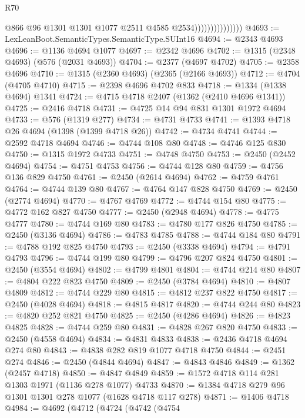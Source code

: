 \begin{lexlean}{R70}
\begin{coremodule}
                                  @866
                                  @96
                                  @1301
                                  @1301
                                  @1077
                                  @2511
                                  @4585
                                  @2534)))))))))))))))
@4693 := LexLeanBoot.SemanticTypes.SemanticType.SUInt16
@4694 := @2343 @4693
@4696 := @1136 @4694 @1077
@4697 := @2342 @4696
@4702 := @1315 (@2348 @4693) (@576 (@2031 @4693))
@4704 := @2377 (@4697 @4702)
@4705 := @2358 @4696
@4710 := @1315 (@2360 @4693) (@2365 (@2166 @4693))
@4712 := @4704 (@4705 @4710)
@4715 := @2398 @4696 @4702 @833
@4718 := @1334 (@1338 @4694) @1341
@4724 := @4715 @4718 @2407 (@1362 (@2410 @4696 @1341))
@4725 := @2416 @4718
@4731 := @4725 @14 @94 @831 @1301 @1972 @4694
@4733 := @576 (@1319 @277)
@4734 := @4731 @4733
@4741 := @1393 @4718 @26 @4694 (@1398 (@1399 @4718 @26))
@4742 := @4734 @4741
@4744 := @2592 @4718 @4694
@4746 := @4744 @108 @80
@4748 := @4746 @125 @830
@4750 := @1315 @1972 @4733
@4751 := @4748 @4750
@4753 := @2450 (@2452 @4694)
@4754 := @4751 @4753
@4756 := @4744 @128 @80
@4759 := @4756 @136 @829 @4750
@4761 := @2450 (@2614 @4694)
@4762 := @4759 @4761
@4764 := @4744 @139 @80
@4767 := @4764 @147 @828 @4750
@4769 := @2450 (@2774 @4694)
@4770 := @4767 @4769
@4772 := @4744 @154 @80
@4775 := @4772 @162 @827 @4750
@4777 := @2450 (@2948 @4694)
@4778 := @4775 @4777
@4780 := @4744 @169 @80
@4783 := @4780 @177 @826 @4750
@4785 := @2450 (@3136 @4694)
@4786 := @4783 @4785
@4788 := @4744 @184 @80
@4791 := @4788 @192 @825 @4750
@4793 := @2450 (@3338 @4694)
@4794 := @4791 @4793
@4796 := @4744 @199 @80
@4799 := @4796 @207 @824 @4750
@4801 := @2450 (@3554 @4694)
@4802 := @4799 @4801
@4804 := @4744 @214 @80
@4807 := @4804 @222 @823 @4750
@4809 := @2450 (@3784 @4694)
@4810 := @4807 @4809
@4812 := @4744 @229 @80
@4815 := @4812 @237 @822 @4750
@4817 := @2450 (@4028 @4694)
@4818 := @4815 @4817
@4820 := @4744 @244 @80
@4823 := @4820 @252 @821 @4750
@4825 := @2450 (@4286 @4694)
@4826 := @4823 @4825
@4828 := @4744 @259 @80
@4831 := @4828 @267 @820 @4750
@4833 := @2450 (@4558 @4694)
@4834 := @4831 @4833
@4838 := @2436 @4718 @4694 @274 @80
@4843 := @4838 @282 @819 @1077 @4718 @4750
@4844 := @2451 @274
@4846 := @2450 (@4844 @4694)
@4847 := @4843 @4846
@4849 := @1362 (@2457 @4718)
@4850 := @4847 @4849
@4859 := @1572 @4718 @114 @281 @1303 @1971 (@1136 @278 @1077) @4733
@4870 := @1384 @4718 @279 @96 @1301 @1301 @278 @1077 (@1628 @4718 @117 @278)
@4871 := @1406 @4718
@4984 := @4692
    (@4712
      (@4724
        (@4742
          (@4754

\end{coremodule}
\end{lexlean}
